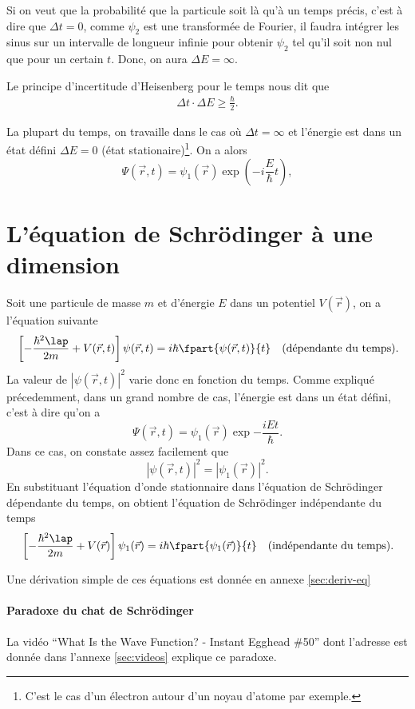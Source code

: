 Si on veut que la probabilité que la particule soit là qu'à un temps précis,
c'est à dire que $\Delta t = 0$,
comme $\psi_2$ est une transformée de Fourier, il faudra intégrer les sinus
sur un intervalle de longueur infinie
pour obtenir $\psi_2$ tel qu'il soit non nul que pour un certain $t$.
Donc, on aura $\Delta E = \infty$.

Le principe d'incertitude d'Heisenberg pour le temps nous dit que
\begin{align*}
  \Delta t \cdot \Delta E \geq \frac{\hbar}{2}.
\end{align*}

La plupart du temps, on travaille dans le cas où
$\Delta t = \infty$ et l'énergie est dans un état défini $\Delta E = 0$
(état stationaire)\footnote{C'est le
cas d'un électron autour d'un noyau d'atome par exemple.}.
On a alors
\[ \Psi(\vec{r}, t) = \psi_1(\vec{r}) \exp\left(-i\frac{E}{\hbar}t\right), \]

\section{L'équation de Schrödinger à une dimension}
Soit une particule de masse $m$ et d'énergie $E$ dans un potentiel $V(\vec{r})$,
on a l'équation suivante
\begin{align*}
	& \left[-\frac{\hbar^2\lap}{2m} + V(\vec{r},t)\right]\psi(\vec{r},t) = i\hbar\fpart{\psi(\vec{r},t)}{t}
	& \text{(dépendante du temps)}.
\end{align*}
La valeur de $|\psi(\vec{r},t)|^2$ varie donc en fonction du temps.
Comme expliqué précedemment, dans un grand nombre de cas, l'énergie
est dans un état défini, c'est à dire qu'on a
\[ \Psi(\vec{r},t) = \psi_1(\vec{r})\exp{-\frac{iEt}{\hbar}}.\]
Dans ce cas, on constate assez facilement que
\[ |\psi(\vec{r},t)|^2 = |\psi_1(\vec{r})|^2.\]
En substituant l'équation d'onde stationnaire dans
l'équation de Schrödinger dépendante du temps, on obtient l'équation
de Schrödinger indépendante du temps
\begin{align*}
	& \left[-\frac{\hbar^2\lap}{2m} + V(\vec{r})\right]\psi_1(\vec{r}) = i\hbar\fpart{\psi_1(\vec{r})}{t}
	& \text{(indépendante du temps)}.
\end{align*}

Une dérivation simple de ces équations est donnée en annexe \ref{sec:deriv-eq}

\paragraph{Paradoxe du chat de Schrödinger} 
La vidéo ``What Is the Wave Function? - Instant Egghead \#50'' dont
l'adresse est donnée dans l'annexe \ref{sec:videos} explique
ce paradoxe.

